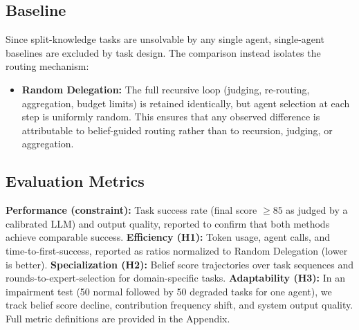 \subsection{Baseline}
Since split-knowledge tasks are unsolvable by any single agent, single-agent baselines are excluded by task design. The comparison instead isolates the routing mechanism:
\begin{itemize}[leftmargin=1.4em]
    \item \textbf{Random Delegation:} The full recursive loop (judging, re-routing, aggregation, budget limits) is retained identically, but agent selection at each step is uniformly random. This ensures that any observed difference is attributable to belief-guided routing rather than to recursion, judging, or aggregation.
\end{itemize}

\subsection{Evaluation Metrics}
\textbf{Performance (constraint):} Task success rate (final score $\geq 85$ as judged by a calibrated LLM) and output quality, reported to confirm that both methods achieve comparable success.
\textbf{Efficiency (H1):} Token usage, agent calls, and time-to-first-success, reported as ratios normalized to Random Delegation (lower is better).
\textbf{Specialization (H2):} Belief score trajectories over task sequences and rounds-to-expert-selection for domain-specific tasks.
\textbf{Adaptability (H3):} In an impairment test (50 normal followed by 50 degraded tasks for one agent), we track belief score decline, contribution frequency shift, and system output quality.
Full metric definitions are provided in the Appendix.
